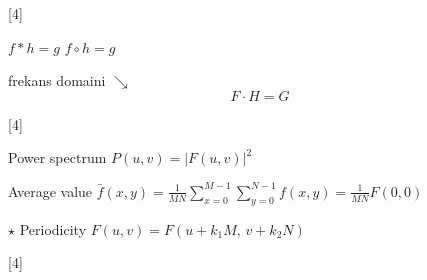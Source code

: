 \documentclass[11pt,a4paper]{article}
\begin{document}
[4]

$f * h = g$ \qquad $f \circ h = g$

frekans domaini $\searrow$
\[ F \cdot H = G \]

[4]

Power spectrum \quad $P(u,v)=|F(u,v)|^2$

Average value \quad $\displaystyle \bar{f}(x,y)=\frac{1}{MN}\sum_{x=0}^{M-1}\sum_{y=0}^{N-1}f(x,y)=\frac{1}{MN}F(0,0)$

{\color{kirmizikalem}$\star$} Periodicity \quad $F(u,v)=F(u+k_1M,\,v+k_2N)$

[4]
\end{document}
